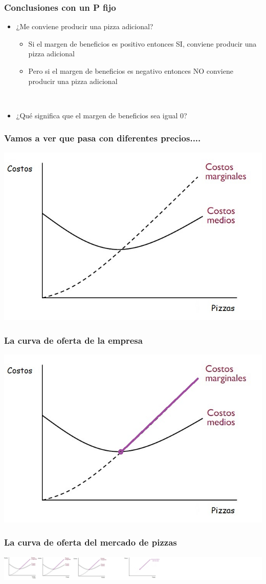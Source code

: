\documentclass{beamer}
\begin{document}
\begin{frame}
\frametitle{ Conclusiones con un P fijo}
\begin{itemize}
    \item ¿Me conviene producir una pizza adicional?
        \begin{itemize}
        \item Si el margen de beneficios es positivo entonces SI, conviene producir una pizza adicional
        \item Pero si el margen de beneficios es negativo entonces NO conviene producir una pizza adicional
        \end{itemize} \\ \vspace{2mm}
    \item ¿Qué significa que el margen de beneficios sea igual 0?
\end{itemize}
\end{frame}

\begin{frame}
\frametitle{ Vamos a ver que pasa con diferentes precios....}
\begin{itemize}
\centering
\includegraphics[scale=0.6]{Figures/Tema_06.20.jpg}
\end{itemize}
\end{frame}

\begin{frame}
\frametitle{ La curva de oferta de la empresa}
\centering
\includegraphics[scale=0.6]{Figures/Tema_06.28.jpg}
\end{frame}

\begin{frame}
\frametitle{ La curva de oferta del mercado de pizzas}
\centering
\includegraphics[scale=0.15]{Figures/Tema_06.29.jpg}
\end{frame}
\end{document}
